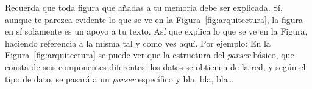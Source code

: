 \documentclass[a4paper, 12pt]{book}
\begin{document}

 
Recuerda que toda figura que añadas a tu memoria debe ser explicada.
Sí, aunque te parezca evidente lo que se ve en la Figura~\ref{fig:arquitectura}, la figura en sí solamente es un apoyo a tu texto.
Así que explica lo que se ve en la Figura, haciendo referencia a la misma tal y como ves aquí.
Por ejemplo: En la Figura~\ref{fig:arquitectura} se puede ver que la estructura del \emph{parser} básico, que consta de seis componentes diferentes: los datos se obtienen de la red, y según el tipo de dato, se pasará a un \emph{parser} específico y bla, bla, bla\ldots
\end{document}
